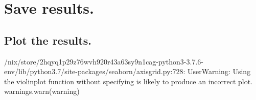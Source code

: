 \documentclass[letterpaper,10pt,english]{sphinxmanual}
\begin{document}
\section{Save results.}
\label{\detokenize{doc-src/ioc-1:save-results}}
\begin{sphinxVerbatim}[commandchars=\\\{\}]
\end{sphinxVerbatim}


\subsection{Plot the results.}
\label{\detokenize{doc-src/ioc-1:plot-the-results}}
\begin{sphinxVerbatim}[commandchars=\\\{\}]
  
         
      
      
      
      
\end{sphinxVerbatim}
\begin{sphinxalltt}
/nix/store/2hqyq1p29z76wvh920r43a63sy9n1cag-python3-3.7.6-env/lib/python3.7/site-packages/seaborn/axisgrid.py:728: UserWarning: Using the violinplot function without specifying  is likely to produce an incorrect plot.
  warnings.warn(warning)
\end{sphinxalltt}
\end{document}
